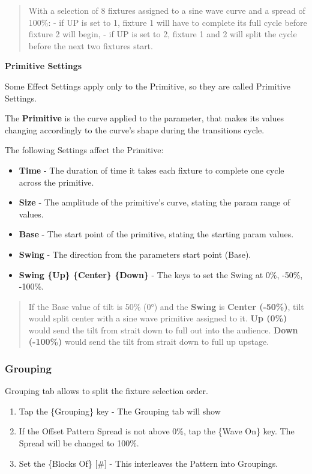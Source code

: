 \documentclass[
]{article}
\begin{document}
\begin{quote}
With a selection of 8 fixtures assigned to a sine wave curve and a spread of 100\%:
- if UP is set to 1, fixture 1 will have to complete its full cycle before fixture 2 will begin,
- if UP is set to 2, fixture 1 and 2 will split the cycle before the next two fixtures start.
\end{quote}

\textbf{Primitive Settings}

Some Effect Settings apply only to the Primitive, so they are called Primitive Settings.

The \textbf{Primitive} is the curve applied to the parameter, that makes its values changing accordingly to the curve's shape during the transitions cycle.

The following Settings affect the Primitive:

\begin{itemize}
\item
  \textbf{Time} - The duration of time it takes each fixture to complete one cycle across the primitive.
\item
  \textbf{Size} - The amplitude of the primitive's curve, stating the param range of values.
\item
  \textbf{Base} - The start point of the primitive, stating the starting param values.
\item
  \textbf{Swing} - The direction from the parameters start point (Base).
\item
  \textbf{Swing \{Up\} \{Center\} \{Down\}} - The keys to set the Swing at 0\%, -50\%, -100\%.
\end{itemize}

\begin{quote}
If the Base value of tilt is 50\% (0°) and the \textbf{Swing} is \textbf{Center (-50\%)}, tilt would split center with a sine wave primitive assigned to it. \textbf{Up (0\%)} would send the tilt from strait down to full out into the audience. \textbf{Down (-100\%)} would send the tilt from strait down to full up upstage.
\end{quote}

\hypertarget{grouping}{%
\subsubsection{Grouping}\label{grouping}}

Grouping tab allows to split the fixture selection order.

\begin{enumerate}
\def\labelenumi{\arabic{enumi}.}
\item
  Tap the \{Grouping\} key - The Grouping tab will show
\item
  If the Offset Pattern Spread is not above 0\%, tap the \{Wave On\} key. The Spread will be changed to 100\%.
\item
  Set the \{Blocks Of\} {[}\#{]} - This interleaves the Pattern into Groupings.
\end{enumerate}
\end{document}
